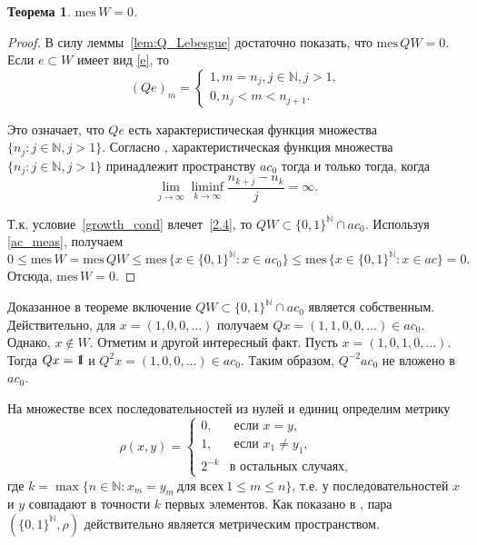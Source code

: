 \documentclass[12pt]{article}
\newcommand{\emm}{\mathrm{1\hspace{-0.3em} I}}
\newtheorem{thm}{Теорема}
\def\N{{\mathbb{N}}}
\def\mes{{\mathrm{mes}}}
\begin{document}
\begin{thm}
$\mes \, W=0$.
\end{thm}

\begin{proof}
В силу леммы~\ref{lem:Q_Lebesgue} достаточно показать, что $\mes \, QW=0$. Если $e\subset W$ имеет вид \eqref{e}, то
$$(Qe)_m=\begin{cases}
1, m=n_j, j\in\N, j>1,\\
0, n_j<m<n_{j+1}.
\end{cases}$$

Это означает, что $Qe$ есть характеристическая функция множества $\{n_j: j\in \N, j>1\}$. Согласно \cite[Лемма 1]{Avdeev2019}, характеристическая функция множества $\{n_j: j\in \N, j>1\}$ принадлежит пространству $ac_0$ тогда и только тогда, когда
\begin{equation}\label{2.4}
    \lim\limits_{j\to\infty}\liminf_{k\to\infty}\frac{n_{k+j}-n_k}j=\infty.
\end{equation}

Т.к. условие~\eqref{growth_cond} влечет~\eqref{2.4}, то $QW \subset \{0,1\}^\N \cap ac_0$. Используя \eqref{ac_meas}, получаем
$$0\le \mes \, W= \mes \, QW\le \mes \, \{x\in \{0,1\}^\N: x\in ac_0\}\le \mes \, \{x\in \{0,1\}^\N: x\in ac\}=0.$$
Отсюда, $\mes \, W=0$.
\end{proof}

Доказанное в теореме включение $QW \subset \{0,1\}^\N \cap ac_0$ является собственным. Действительно, для $x=(1, 0, 0, \dots)$ получаем $Qx=(1,1, 0, 0, \dots)\in ac_0$. Однако, $x\notin W$. Отметим и другой интересный факт. Пусть $x=(1,0,1,0,\dots)$. Тогда $Qx=\emm$ и $Q^2x=(1,0,0, \dots)\in ac_0$. Таким образом, $Q^{-2}ac_0$ не вложено в $ac_0$.


На множестве всех последовательностей из нулей и единиц определим метрику
$$
	\rho(x,y)=
	\begin{cases}
		0, & \mbox{~если~} x=y, \\
		1, & \mbox{~если~} x_1\neq y_1, \\
		2^{-k} & \mbox{в остальных случаях}, %
	\end{cases}
$$
где $k=\max\{n\in\N : x_m=y_m \ \text{для всех} \ 1\le m\le n\}$,
т.е. у последовательностей $x$ и $y$ совпадают в точности $k$ первых элементов.
Как показано в \cite[Утверждение 2.1.8]{Edgar}, пара $(\{0,1\}^\N, \rho)$ действительно является метрическим пространством.
\end{document}
